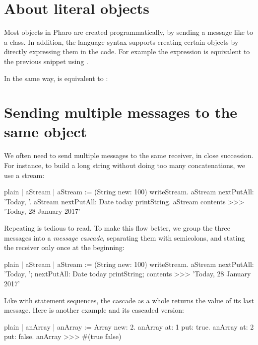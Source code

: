 \documentclass[10pt,twoside,english]{_support/latex/sbabook/sbabook}
\begin{document}
\section{About literal objects}
Most objects in Pharo are created programmatically, by sending a message like  to a class.
In addition, the language syntax supports creating certain objects by directly expressing them in the code.
For example the expression   is equivalent to the previous snippet using .

In the same way,  is equivalent to :

\section{Sending multiple messages to the same object}
We often need to send multiple messages to the same receiver, in close succession.
For instance, to build a long string without doing too many concatenations, we use a stream:

\begin{displaycode}{plain}
| aStream |
aStream := (String new: 100) writeStream.
aStream nextPutAll: 'Today, '.
aStream nextPutAll: Date today printString.
aStream contents
>>> 'Today, 28 January 2017'
\end{displaycode}

Repeating  is tedious to read.
To make this flow better, we group the three messages into a \textit{message cascade}, separating them with semicolons, and stating the receiver only once at the beginning:

\begin{displaycode}{plain}
| aStream |
aStream := (String new: 100) writeStream.
aStream 
	nextPutAll: 'Today, ';
	nextPutAll: Date today printString;
	contents
>>> 'Today, 28 January 2017'
\end{displaycode}

Like with statement sequences, the cascade as a whole returns the value of its last message.
Here is another example and its cascaded version:

\begin{displaycode}{plain}
| anArray |
anArray := Array new: 2. 
anArray at: 1 put: true.
anArray at: 2 put: false.
anArray
>>> #(true false)
\end{displaycode}
\end{document}
